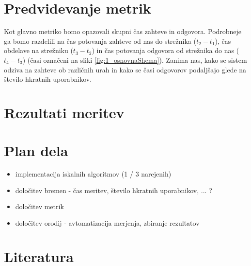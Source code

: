 \section{Predvidevanje metrik}

Kot glavno metriko bomo opazovali skupni čas zahteve in odgovora.
Podrobneje ga bomo razdelili na čas potovanja zahteve od nas do strežnika ($t_2 - t_1$), čas obdelave na strežniku ($t_3 - t_2$) in čas potovanja odgovora od strežnika do nas ($t_4 - t_3$) (časi označeni na sliki \ref{fig:1_osnovnaShema}).
Zanima nas, kako se sistem odziva na zahteve ob različnih urah in kako se časi odgovorov podaljšajo glede na število hkratnih uporabnikov.

\section{Rezultati meritev}

\section{Plan dela}

\begin{itemize}
\item implementacija iskalnih algoritmov (1 / 3 narejenih)
\item določitev bremen - čas meritev, število hkratnih uporabnikov, ... ?
\item določitev metrik 
\item določitev orodij - avtomatizacija merjenja, zbiranje rezultatov
\end{itemize}

\section{Literatura}

%
%

